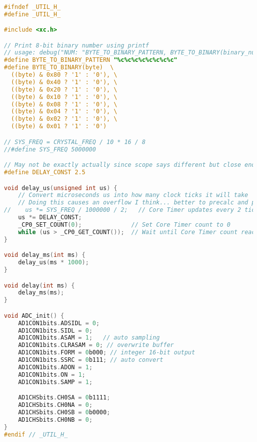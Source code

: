 \begin{lstlisting}[language=C]

#ifndef _UTIL_H_
#define _UTIL_H_

#include <xc.h>

// Print 8-bit binary number using printf
// usage: debug("NUM: "BYTE_TO_BINARY_PATTERN, BYTE_TO_BINARY(binary_number));
#define BYTE_TO_BINARY_PATTERN "%c%c%c%c%c%c%c%c"
#define BYTE_TO_BINARY(byte)  \
  ((byte) & 0x80 ? '1' : '0'), \
  ((byte) & 0x40 ? '1' : '0'), \
  ((byte) & 0x20 ? '1' : '0'), \
  ((byte) & 0x10 ? '1' : '0'), \
  ((byte) & 0x08 ? '1' : '0'), \
  ((byte) & 0x04 ? '1' : '0'), \
  ((byte) & 0x02 ? '1' : '0'), \
  ((byte) & 0x01 ? '1' : '0')

// SYS_FREQ = CRYSTAL_FREQ / 10 * 16 / 8
//#define SYS_FREQ 5000000

// May not be exactly actually since scope says different but close enough
#define DELAY_CONST 2.5

void delay_us(unsigned int us) {
    // Convert microseconds us into how many clock ticks it will take
    // Doing this causes an overflow I think... better to precalc and put in magic number
//    us *= SYS_FREQ / 1000000 / 2;   // Core Timer updates every 2 ticks
    us *= DELAY_CONST;
    _CP0_SET_COUNT(0);              // Set Core Timer count to 0
    while (us > _CP0_GET_COUNT());  // Wait until Core Timer count reaches the number we calculated earlier
}

void delay_ms(int ms) {
    delay_us(ms * 1000);
}

void delay(int ms) {
    delay_ms(ms);
}

void ADC_init() {
    AD1CON1bits.ADSIDL = 0;
    AD1CON1bits.SIDL = 0;
    AD1CON1bits.ASAM = 1;   // auto sampling
    AD1CON1bits.CLRASAM = 0; // overwrite buffer
    AD1CON1bits.FORM = 0b000; // integer 16-bit output
    AD1CON1bits.SSRC = 0b111; // auto convert
    AD1CON1bits.ADON = 1;
    AD1CON1bits.ON = 1;
    AD1CON1bits.SAMP = 1;

    AD1CHSbits.CH0SA = 0b1111;
    AD1CHSbits.CH0NA = 0;
    AD1CHSbits.CH0SB = 0b0000;
    AD1CHSbits.CH0NB = 0;
}
#endif // _UTIL_H_
\end{lstlisting}

